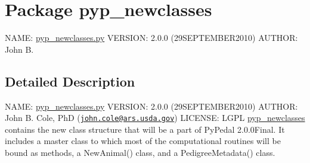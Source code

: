 \hypertarget{namespacepyp__newclasses}{
\section{Package pyp\_\-newclasses}
\label{namespacepyp__newclasses}
}


NAME: \hyperlink{pyp__newclasses_8py_source}{pyp\_\-newclasses.py} VERSION: 2.0.0 (29SEPTEMBER2010) AUTHOR: John B.  




\subsection{Detailed Description}
NAME: \hyperlink{pyp__newclasses_8py_source}{pyp\_\-newclasses.py} VERSION: 2.0.0 (29SEPTEMBER2010) AUTHOR: John B. Cole, PhD (\href{mailto:john.cole@ars.usda.gov}{\tt john.cole@ars.usda.gov}) LICENSE: LGPL \hyperlink{namespacepyp__newclasses}{pyp\_\-newclasses} contains the new class structure that will be a part of PyPedal 2.0.0Final. It includes a master class to which most of the computational routines will be bound as methods, a NewAnimal() class, and a PedigreeMetadata() class. 